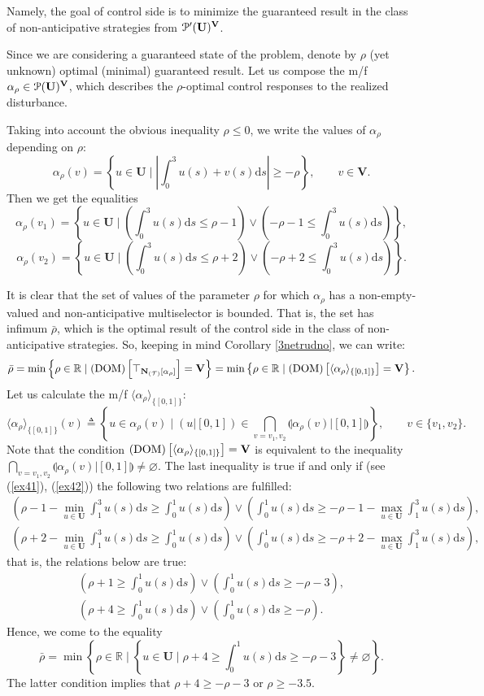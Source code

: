 \documentclass[sn-mathphys,Numbered,pdflatex]{sn-jnl}%
\theoremstyle{thmstyleone}%
\theoremstyle{thmstyletwo}%
\theoremstyle{thmstylethree}%
\renewcommand{\ge}{\geqslant}%
\renewcommand{\le}{\leqslant}%
\newcommand{\beq}{\begin{equation}}
\newcommand{\eeq}{\end{equation}}
\newcommand{\mydef}{\mathrel{\triangleq}}%
\newcommand{\icP}[1]{\EuScript{P}({#1})}%
\newcommand{\icPp}[1]{\EuScript{P^\prime}({#1})}%
\newcommand{\res}[2]{\ensuremath{(#1|#2)}}%
\newcommand{\RA}{\ensuremath{\mathbb R}}%
\newcommand{\naTc}{\ensuremath{\mathcal{T}}}%
\newcommand{\naN}{\AnaN{\naTc}{}}%
\newcommand{\naNo}[1]{\naN\setbox0=\hbox{\text{$#1$}}\ifdim\wd0=0pt\else[{#1}]\fi}%
\newcommand{\AnaN}[2]{\mathbf{N}_{(#1)}\setbox0=\hbox{\text{$#2$}}\ifdim\wd0=0pt\else\left[{#2}\right]\fi}%
\newcommand{\nado}[1]{(\mathrm{DOM})\setbox0=\hbox{\text{$#1$}}\ifdim\wd0=0pt\else\left[{#1}\right]\fi}%
\newcommand{\sres}[2]{\llparenthesis#1|#2\rrparenthesis}%
\newcommand{\Ana}[2]{\ensuremath{\langle{#1}\rangle_{#2}}}%
\newcommand{\UB}{{\mathbf U}}%
\newcommand{\VB}{{\mathbf V}}%
\newcommand{\dup}{\mathrm{d}}%
\newcommand{\fref}[1]{{\rm(\ref{#1})}}   %
\begin{document}
Namely, the goal of control side is to minimize the guaranteed result in the class of non-anticipative strategies from $\icPp{\UB}^\VB$.

Since we are considering a guaranteed state of the problem, denote by $\rho$ (yet unknown) optimal (minimal) guaranteed result.
Let us compose the m/f $\alpha_\rho\in\icP{\UB}^\VB$, which describes the $\rho$-optimal control responses to the realized disturbance.

Taking into account the obvious inequality $\rho\le0$, we write the values of $\alpha_\rho$ depending on $\rho$:
\beq\label{ex40}
   \alpha_\rho(v)=\left\{u\in\UB\mid\left|\int_0^3u(s)+v(s)\dup s\right|\ge-\rho\right\},\qquad v\in\VB.
\eeq
Then we get the equalities
\beq\label{ex41}
   \alpha_\rho(v_1)=\left\{u\in\UB\mid\left(\int_0^3u(s)\dup s\le\rho-1\right)\vee\left(-\rho-1\le\int_0^3u(s)\dup s\right)\right\},
\eeq
\beq\label{ex42}
   \alpha_\rho(v_2)=\left\{u\in\UB\mid\left(\int_0^3u(s)\dup s\le\rho+2\right)\vee\left(-\rho+2\le\int_0^3u(s)\dup s\right)\right\}.
\eeq

It is clear that the set of values of the parameter $\rho$ for which $\alpha_{\rho}$ has a non-empty-valued and non-anticipative multiselector is bounded.
That is, the set has infimum $\bar\rho$, which is the optimal result of the control side in the class of non-anticipative strategies.
So, keeping in mind Corollary  \ref{3netrudno}, we can write:
$$%
\bar\rho=\min\left\{\rho\in\RA\mid\nado{\top_{\naNo{\alpha_{\rho}}}}=\VB \right\}=\min\left\{\rho\in\RA\mid\nado{\Ana{\alpha_{\rho}}{\{[0,1]\}}}=\VB \right\}.
$$
Let us calculate the m/f $\Ana{\alpha_{\rho}}{\{[0,1]\}}$:
$$
\Ana{\alpha_{\rho}}{\{[0,1]\}}(v)\mydef\left\{u\in\alpha_\rho(v)\mid \res{u}{[0,1 ]}\in\bigcap_{v=v_1,v_2}\sres{\alpha_\rho(v)}{[0,1]}\right\},\qquad v\in\{v_1,v_2\}.
$$
Note that the condition $\nado{\Ana{\alpha_{\rho}}{\{[0,1]\}}}=\VB$ is equivalent to the inequality $\bigcap_{v=v_1,v_2}\sres{\alpha_\rho(v)}{[0,1]}\neq\varnothing$.
The last inequality is true if and only if (see \fref{ex41}, \fref{ex42}) the following two relations are fulfilled:
\begin{gather*}
\left (\rho-1-\min_{u\in\UB}\int_1^3u(s)\dup s\ge\int_0^1u(s)\dup s\right)\vee\left(\int_0^1u(s)\dup s\ge-\rho-1-\max_{u\in\UB}\int_1^3u(s)\dup s\right), \\
  \left (\rho+2-\min_{u\in\UB}\int_1^3u(s)\dup s\ge\int_0^1u(s)\dup s\right)\vee\left(\int_0^1u(s)\dup s\ge-\rho+2-\max_{u\in\UB}\int_1^3u(s)\dup s\right),
\end{gather*}
that is, the relations below are true:
\begin{gather*}
   \left( \rho+1\ge\int_0^1u(s)\dup s\right)\vee\left(\int_0^1u(s)\dup s\ge-\rho-3\right), \\
  \left ( \rho+4\ge\int_0^1u(s)\dup s\right)\vee\left(\int_0^1u(s)\dup s\ge-\rho\right).
\end{gather*}
Hence, we come to the equality
$$
\bar\rho=\min\left\{\rho\in\RA\mid\left\{u\in\UB\mid \rho+4\ge\int_0^1u(s)\dup s\ge-\rho-3\right\}\neq\varnothing\right\}.
$$
The latter condition implies that $\rho+4\ge-\rho-3$ or $\rho\ge-3.5$.
\end{document}
